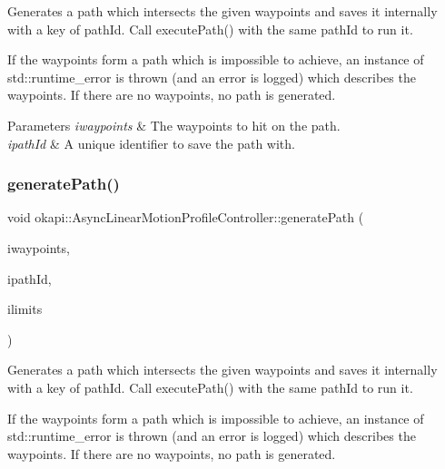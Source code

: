 Generates a path which intersects the given waypoints and saves it internally with a key of path\+Id. Call {\ttfamily execute\+Path()} with the same {\ttfamily path\+Id} to run it.

If the waypoints form a path which is impossible to achieve, an instance of {\ttfamily std\+::runtime\+\_\+error} is thrown (and an error is logged) which describes the waypoints. If there are no waypoints, no path is generated.


\begin{DoxyParams}{Parameters}
{\em iwaypoints} & The waypoints to hit on the path. \\
\hline
{\em ipath\+Id} & A unique identifier to save the path with. \\
\hline
\end{DoxyParams}
\mbox{\label{classokapi_1_1AsyncLinearMotionProfileController_ada94ccc2679082ea7fb2317458ca80d1}} 
\subsubsection{\texorpdfstring{generatePath()}{generatePath()}\hspace{0.1cm}{\footnotesize\ttfamily [2/2]}}
{\footnotesize\ttfamily void okapi\+::\+Async\+Linear\+Motion\+Profile\+Controller\+::generate\+Path (\begin{DoxyParamCaption}\item[{std\+::initializer\+\_\+list$<$ Q\+Length $>$}]{iwaypoints,  }\item[{const std\+::string \&}]{ipath\+Id,  }\item[{const \mbox{\hyperlink{structokapi_1_1PathfinderLimits}{Pathfinder\+Limits}} \&}]{ilimits }\end{DoxyParamCaption})}

Generates a path which intersects the given waypoints and saves it internally with a key of path\+Id. Call {\ttfamily execute\+Path()} with the same path\+Id to run it.

If the waypoints form a path which is impossible to achieve, an instance of {\ttfamily std\+::runtime\+\_\+error} is thrown (and an error is logged) which describes the waypoints. If there are no waypoints, no path is generated.


